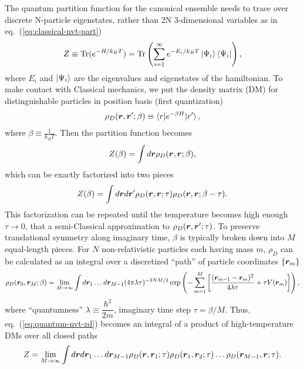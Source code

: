 The quantum partition function for the canonical ensemble needs to trace over discrete N-particle eigenstates, rather than 2N 3-dimensional variables as in eq.~(\ref{eq:classical-nvt-part})
\begin{align}
Z\equiv \text{Tr}(e^{-H/k_BT})=\text{Tr}\left(
\sum\limits_{i=1}^{\infty} e^{-E_i/k_BT}\ket{\Psi_i}\bra{\Psi_i}
\right),
\end{align}
where $E_i$ and $\ket{\Psi_i}$ are the eigenvalues and eigenstates of the hamiltonian. To make contact with Classical mechanics, we put the density matrix (DM) for distinguishable particles in position basis (first quantization)
\begin{align}
\rho_D(\boldsymbol{r}, \boldsymbol{r}'; \beta) \equiv \braket{r|e^{-\beta H}|r'},
\end{align}
where $\beta\equiv \frac{1}{k_B T}$. 
Then the partition function becomes
\begin{align} \label{eq:quantum-nvt-zd}
Z(\beta) = \int d\boldsymbol{r} \rho_D(\boldsymbol{r},\boldsymbol{r};\beta),
\end{align}
which can be exactly factorized into two pieces
\begin{align}
Z(\beta) = \int d\boldsymbol{r}d\boldsymbol{r}' \rho_D(\boldsymbol{r},\boldsymbol{r};\tau)\rho_D(\boldsymbol{r},\boldsymbol{r};\beta-\tau).
\end{align}
This factorization can be repeated until the temperature becomes high enough $\tau\rightarrow0$, that a semi-Classical approximation to $\rho_D(\boldsymbol{r},\boldsymbol{r}';\tau)$. To preserve translational symmetry along imaginary time, $\beta$ is typically broken down into $M$ equal-length pieces.
For $N$ non-relativistic particles each having mass $m$, $\rho_D$ can be calculated as an integral over a discretized ``path'' of particle coordinates $\{\boldsymbol{r}_m\}$
\begin{align} \label{eq:pimc-rhod}
\rho_D(\boldsymbol{r}_0,\boldsymbol{r}_M;\beta) = \lim\limits_{M\rightarrow\infty} \int d\boldsymbol{r}_1\dots d\boldsymbol{r}_{M-1}
(4\pi\lambda\tau)^{-3NM/2}\exp\left(
-\sum\limits_{m=1}^M \left[
\dfrac{(\boldsymbol{r}_{m-1}-\boldsymbol{r}_m)^2}{4\lambda\tau} + \tau V(\boldsymbol{r}_m)
\right]
\right),
\end{align}
where ``quantumness'' $\lambda\equiv\dfrac{\hbar^2}{2m}$, imaginary time step $\tau=\beta/M$. Thus, eq.~(\ref{eq:quantum-nvt-zd}) becomes an integral of a product of high-temperature DMs over all closed paths
\begin{align} \label{eq:quantum-nvt-zd-pi}
Z=\lim\limits_{M\rightarrow\infty} \int d\boldsymbol{r} d\boldsymbol{r}_1\dots d\boldsymbol{r}_{M-1}
\rho_D(\boldsymbol{r},\boldsymbol{r}_1;\tau)\rho_D(\boldsymbol{r}_1,\boldsymbol{r}_2;\tau)\dots\rho_D(\boldsymbol{r}_{M-1},\boldsymbol{r};\tau).
\end{align}
